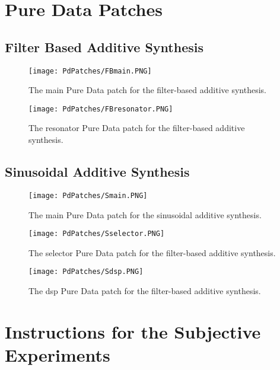 \chapter{Pure Data Patches}\label{ap:pd_patches}

\section{Filter Based Additive Synthesis}
\begin{figure}[H]
  \centering
    \texttt{[image: PdPatches/FBmain.PNG]}
      \caption{The main Pure Data patch for the filter-based additive synthesis.}
      \label{fig:FBmain}
\end{figure}

\begin{figure}[H]
  \centering
    \texttt{[image: PdPatches/FBresonator.PNG]}
      \caption{The resonator Pure Data patch for the filter-based additive synthesis.}
      \label{fig:FBres}
\end{figure}

\section{Sinusoidal Additive Synthesis}

\begin{figure}[H]
  \centering
    \texttt{[image: PdPatches/Smain.PNG]}
      \caption{The main Pure Data patch for the sinusoidal additive synthesis.}
      \label{fig:Smain}
\end{figure}

\begin{figure}[H]
  \centering
    \texttt{[image: PdPatches/Sselector.PNG]}
      \caption{The selector Pure Data patch for the filter-based additive synthesis.}
      \label{fig:Ssel}
\end{figure}

\begin{figure}[H]
  \centering
    \texttt{[image: PdPatches/Sdsp.PNG]}
      \caption{The dsp Pure Data patch for the filter-based additive synthesis.}
      \label{fig:Sdsp}
\end{figure}

\chapter{Instructions for the Subjective Experiments}

